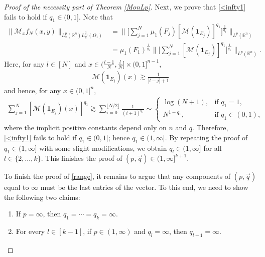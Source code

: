 \documentclass[11pt, reqno]{amsart}
\theoremstyle{definition}
\theoremstyle{remark}
\numberwithin{equation}{section}
\newcommand{\vq}{\vec q}
\begin{document}
\begin{proof}[Proof of the necessity part of Theorem \ref{MonLp}]
Next, we prove that \eqref{<infty1} fails
to hold if $q_1\in(0,1]$.
Note that
\begin{align*}
\|\mathcal M_xf_N(x,y)\|_{L^p_x(\mathbb R^n)L^{q_1}_y(\Omega_1)}
&=\Bigg\|\Bigg[\sum_{j=1}^N\mu_1(F_j)
[\mathcal M(\mathbf{1}_{E_j})]^{q_1}\Bigg]^{\frac1{q_1}}\Bigg\|_{L^p(\mathbb R^n)}\\
&=\mu_1(F_1)^{\frac1{q_1}}
\Bigg\|\Bigg[\sum_{j=1}^N
[\mathcal M(\mathbf{1}_{E_j})]^{q_1}\Bigg]^{\frac1{q_1}}\Bigg\|_{L^p(\mathbb R^n)}.
\end{align*}
Here, for any $l\in[N]$ and
$x\in(\frac{l-1}{N},\frac{l}{N}]\times(0,1]^{n-1}$,
\begin{align*}
\mathcal M(\mathbf{1}_{E_j})(x)
\gtrsim \frac{1}{|l-j|+1}
\end{align*}
and hence, for any $x\in(0,1]^n$,
\begin{align*}
\sum_{j=1}^N [\mathcal M(\mathbf{1}_{E_j})(x)]^{q_1}
\gtrsim \sum_{i=0}^{\lfloor N/2\rfloor} \frac{1}{(i+1)^{q_1}}
\sim \begin{cases}
\log (N+1), &\text{if } q_1=1,\\
N^{1-q_1}, &\text{if } q_1\in(0,1),
\end{cases}
\end{align*}
where the implicit positive constants depend only on $n$ and $q$.
Therefore, \eqref{<infty1} fails to hold if $q_1\in(0,1]$;
hence $q_1\in(1,\infty]$.
By repeating the proof of $q_1\in(1,\infty]$ with
some slight modifications, we obtain $q_l\in(1,\infty]$
for all $l\in\{2,\ldots,k\}$.
This finishes the proof of $(p,\vec q)\in(1,\infty]^{k+1}$.

To finish the proof of \eqref{range}, it remains to argue that any components of $(p,\vq)$ equal to $\infty$ must be the last entries of the vector.
To this end, we need to show the following two claims:
\begin{enumerate}[\rm(i)]
\item\label{p infty}
If $p=\infty$, then $q_1=\cdots=q_k=\infty$.

\item\label{q infty}
For every $l\in[k-1]$,
if $p\in(1,\infty)$ and $q_l=\infty$,
then $q_{l+1}=\infty$.
\end{enumerate}


\end{proof}
\end{document}
